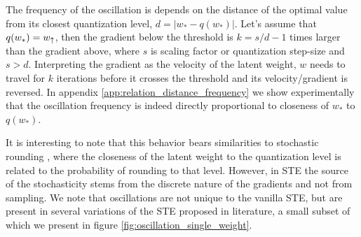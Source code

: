 The frequency of the oscillation is depends on the distance of the optimal value from its closest quantization level,  $d =|w_* - q(w_*) |$. Let's assume that  $q(w_*)=w_{\uparrow}$, then the gradient below the threshold is $k=s/d-1$ times larger than the gradient above, where $s$ is scaling factor or quantization step-size and $s>d$. Interpreting the gradient as the velocity of the latent weight, $w$ needs to travel for $k$ iterations before it crosses the threshold and its velocity/gradient is reversed. In appendix \ref{app:relation_distance_frequency} we show experimentally that the oscillation frequency is indeed directly proportional to closeness of $w_*$ to $q(w_*)$. 

It is interesting to note that this behavior bears similarities to stochastic rounding \citep{Gupta2015}, where the closeness of the latent weight to the quantization level is related to the probability of rounding to that level. However, in STE the source of the stochasticity stems from the discrete nature of the gradients and not from sampling. We note that oscillations are not unique to the vanilla STE, but are present in several variations of the STE proposed in literature, a small subset of which we present in figure \ref{fig:oscillation_single_weight}.

 


